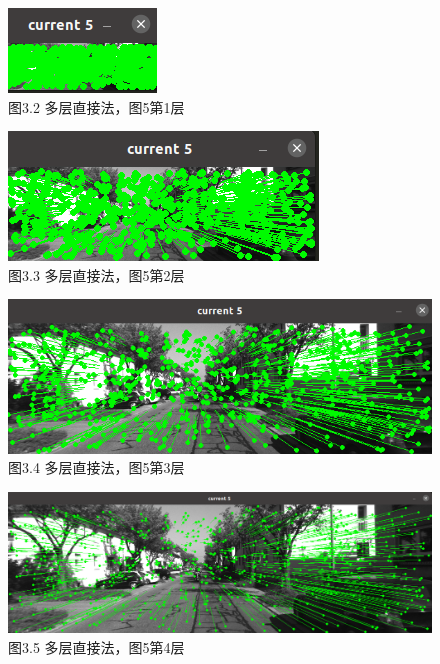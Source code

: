 \documentclass[40pt,a4paper，UTF8]{ctexart}
\numberwithin{equation}{section}
\begin{document}
\begin{figure}[H]
\centering
\includegraphics[scale=1]{ch6_3_4.png} {\\图3.2 多层直接法，图5第1层}
\end{figure}

\begin{figure}[H]
\centering
\includegraphics[scale=1]{ch6_3_5.png} {\\图3.3 多层直接法，图5第2层}
\end{figure}

\begin{figure}[H]
\centering
\includegraphics[scale=0.8]{ch6_3_6.png} {\\图3.4 多层直接法，图5第3层}
\end{figure}

\begin{figure}[H]
\centering
\includegraphics[scale=0.45]{ch6_3_2.png} {\\图3.5 多层直接法，图5第4层}
\end{figure}
\end{document}

